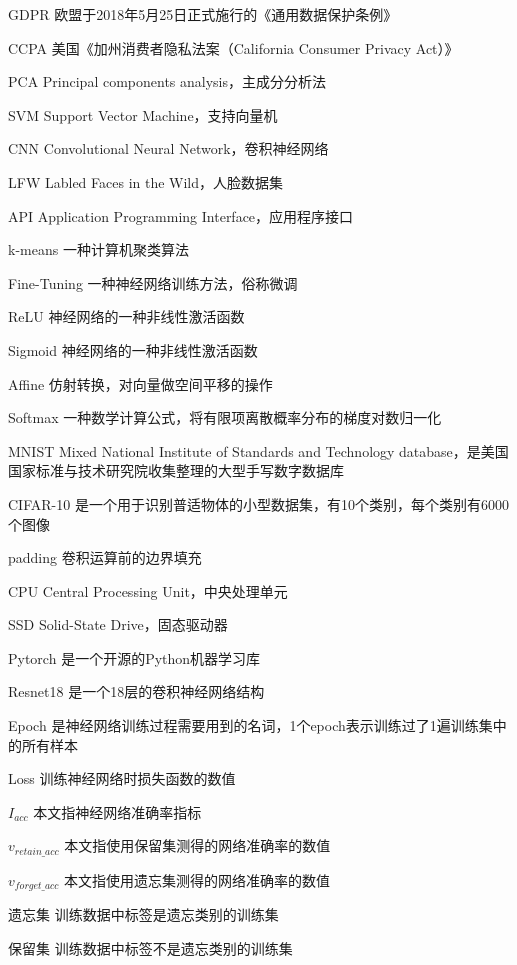 
\begin{denotation}[3cm]
  \item[GDPR] 欧盟于2018年5月25日正式施行的《通用数据保护条例》
  \item[CCPA] 美国《加州消费者隐私法案（California Consumer Privacy Act）》 
  \item[PCA] Principal components analysis，主成分分析法
  \item[SVM] Support Vector Machine，支持向量机
  \item[CNN] Convolutional Neural Network，卷积神经网络
  \item[LFW] Labled Faces in the Wild，人脸数据集
  \item[API] Application Programming Interface，应用程序接口
  \item[k-means] 一种计算机聚类算法
  \item[Fine-Tuning] 一种神经网络训练方法，俗称微调
  \item[ReLU] 神经网络的一种非线性激活函数
  \item[Sigmoid] 神经网络的一种非线性激活函数
  \item[Affine] 仿射转换，对向量做空间平移的操作
  \item[Softmax] 一种数学计算公式，将有限项离散概率分布的梯度对数归一化
  \item[MNIST] Mixed National Institute of Standards and Technology database，是美国国家标准与技术研究院收集整理的大型手写数字数据库
  \item[CIFAR-10] 是一个用于识别普适物体的小型数据集，有10个类别，每个类别有6000个图像
  \item[padding] 卷积运算前的边界填充
  \item[CPU] Central Processing Unit，中央处理单元
  \item[SSD] Solid-State Drive，固态驱动器
  \item[Pytorch] 是一个开源的Python机器学习库
  \item[Resnet18] 是一个18层的卷积神经网络结构
  \item[Epoch] 是神经网络训练过程需要用到的名词，1个epoch表示训练过了1遍训练集中的所有样本
  \item[Loss] 训练神经网络时损失函数的数值
  \item[$I_{acc}$] 本文指神经网络准确率指标
  \item[$v_{retain\_acc}$] 本文指使用保留集测得的网络准确率的数值
  \item[$v_{forget\_acc}$] 本文指使用遗忘集测得的网络准确率的数值
  \item[遗忘集] 训练数据中标签是遗忘类别的训练集 
  \item[保留集]  训练数据中标签不是遗忘类别的训练集
\end{denotation}



